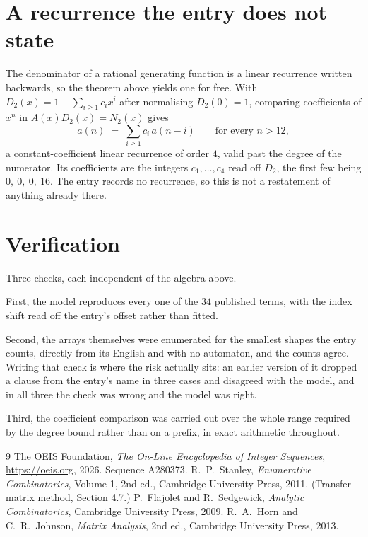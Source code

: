 \documentclass[11pt,a4paper]{article}
\theoremstyle{plain}
\theoremstyle{definition}
\begin{document}
\section{A recurrence the entry does not state}

The denominator of a rational generating function is a linear recurrence written backwards, so
the theorem above yields one for free. With $D_2(x)=1-\sum_{i\ge1}c_ix^i$ after normalising
$D_2(0)=1$, comparing coefficients of $x^n$ in $A(x)D_2(x)=N_2(x)$ gives
\[
a(n)\;=\;\sum_{i\ge1}c_i\,a(n-i)\qquad\text{for every }n>12,
\]
a constant-coefficient linear recurrence of order $4$, valid past the degree of the
numerator. Its coefficients are the integers $c_1,\dots,c_{4}$ read off $D_2$, the first few being $0,\ 0,\ 0,\ 16$. The entry records no recurrence, so this is not a restatement of anything
already there.

\section{Verification}

Three checks, each independent of the algebra above.

First, the model reproduces every one of the $34$ published terms, with the index shift
read off the entry's offset rather than fitted.

Second, the arrays themselves were enumerated for the smallest shapes the entry counts,
directly from its English and with no automaton, and the counts agree. Writing that check is
where the risk actually sits: an earlier version of it dropped a clause from the entry's name
in three cases and disagreed with the model, and in all three the check was wrong and the model
was right.

Third, the coefficient comparison was carried out over the whole range required by the degree
bound rather than on a prefix, in exact arithmetic throughout.

\begin{thebibliography}{9}
 The OEIS Foundation, \emph{The On-Line Encyclopedia of Integer
Sequences}, \url{https://oeis.org}, 2026. Sequence A280373.
 R.~P.~Stanley, \emph{Enumerative Combinatorics}, Volume 1, 2nd ed.,
Cambridge University Press, 2011. (Transfer-matrix method, Section 4.7.)
 P.~Flajolet and R.~Sedgewick, \emph{Analytic Combinatorics}, Cambridge
University Press, 2009.
 R.~A.~Horn and C.~R.~Johnson, \emph{Matrix Analysis}, 2nd ed., Cambridge
University Press, 2013.
\end{thebibliography}
\end{document}
